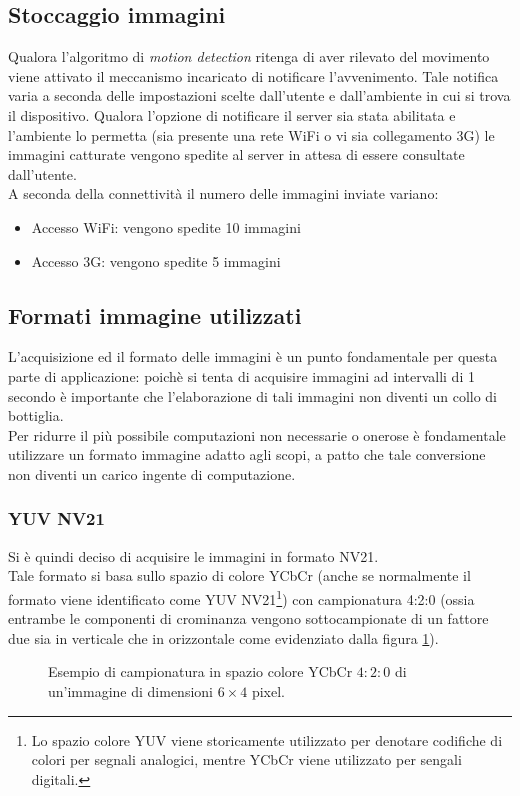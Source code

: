 \subsection{Stoccaggio immagini}
Qualora l'algoritmo di \textit{motion detection} ritenga di aver rilevato del movimento viene attivato il meccanismo incaricato di notificare l'avvenimento. Tale notifica varia a seconda delle impostazioni scelte dall'utente e dall'ambiente in cui si trova il dispositivo. Qualora l'opzione di notificare il server sia stata abilitata e l'ambiente lo permetta (sia presente una rete WiFi o vi sia collegamento 3G) le immagini catturate vengono spedite al server in attesa di essere consultate dall'utente.\\
A seconda della connettività il numero delle immagini inviate variano:
\begin{itemize}
  \item Accesso WiFi: vengono spedite 10 immagini
  \item Accesso 3G: vengono spedite 5 immagini
\end{itemize}

\subsection{Formati immagine utilizzati}
L'acquisizione ed il formato delle immagini è un punto fondamentale per questa parte di applicazione: poichè si tenta di acquisire immagini ad intervalli di 1 secondo è importante che l'elaborazione di tali immagini non diventi un collo di bottiglia.\\

Per ridurre il più possibile computazioni non necessarie o onerose è fondamentale utilizzare un formato immagine adatto agli scopi, a patto che tale conversione non diventi un carico ingente di computazione.\\

\subsubsection{YUV NV21}
Si è quindi deciso di acquisire le immagini in formato NV21.\\
Tale formato si basa sullo spazio di colore YCbCr (anche se normalmente il formato viene identificato come YUV NV21\footnote{ Lo spazio colore YUV viene storicamente utilizzato per denotare codifiche di colori per segnali analogici, mentre YCbCr viene utilizzato per sengali digitali.}) con campionatura 4:2:0 (ossia entrambe le componenti di crominanza vengono sottocampionate di un fattore due sia in verticale che in orizzontale come evidenziato dalla figura \ref{YUVsampling}).\\
\begin{figure}[!ht]
\begin{center}
\YUVsampling
\end{center}
\caption{Esempio di campionatura in spazio colore YCbCr $4:2:0$ di un'immagine di dimensioni $6×4$ pixel.}
\label{YUVsampling}
\end{figure}

